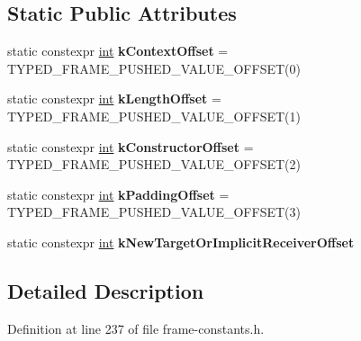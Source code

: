 \subsection*{Static Public Attributes}
\begin{DoxyCompactItemize}
\item 
\mbox{\label{classv8_1_1internal_1_1ConstructFrameConstants_ae356b84de707c1b93a37370055641504}} 
static constexpr \mbox{\hyperlink{classint}{int}} {\bfseries k\+Context\+Offset} = T\+Y\+P\+E\+D\+\_\+\+F\+R\+A\+M\+E\+\_\+\+P\+U\+S\+H\+E\+D\+\_\+\+V\+A\+L\+U\+E\+\_\+\+O\+F\+F\+S\+ET(0)
\item 
\mbox{\label{classv8_1_1internal_1_1ConstructFrameConstants_a885e6406ff090efa02adfc0b1968943f}} 
static constexpr \mbox{\hyperlink{classint}{int}} {\bfseries k\+Length\+Offset} = T\+Y\+P\+E\+D\+\_\+\+F\+R\+A\+M\+E\+\_\+\+P\+U\+S\+H\+E\+D\+\_\+\+V\+A\+L\+U\+E\+\_\+\+O\+F\+F\+S\+ET(1)
\item 
\mbox{\label{classv8_1_1internal_1_1ConstructFrameConstants_a80ba4c630620f950738720ca43fc4440}} 
static constexpr \mbox{\hyperlink{classint}{int}} {\bfseries k\+Constructor\+Offset} = T\+Y\+P\+E\+D\+\_\+\+F\+R\+A\+M\+E\+\_\+\+P\+U\+S\+H\+E\+D\+\_\+\+V\+A\+L\+U\+E\+\_\+\+O\+F\+F\+S\+ET(2)
\item 
\mbox{\label{classv8_1_1internal_1_1ConstructFrameConstants_a3b118c99869a04a26f7d68f4021ff2d2}} 
static constexpr \mbox{\hyperlink{classint}{int}} {\bfseries k\+Padding\+Offset} = T\+Y\+P\+E\+D\+\_\+\+F\+R\+A\+M\+E\+\_\+\+P\+U\+S\+H\+E\+D\+\_\+\+V\+A\+L\+U\+E\+\_\+\+O\+F\+F\+S\+ET(3)
\item 
static constexpr \mbox{\hyperlink{classint}{int}} {\bfseries k\+New\+Target\+Or\+Implicit\+Receiver\+Offset}
\end{DoxyCompactItemize}


\subsection{Detailed Description}


Definition at line 237 of file frame-\/constants.\+h.




